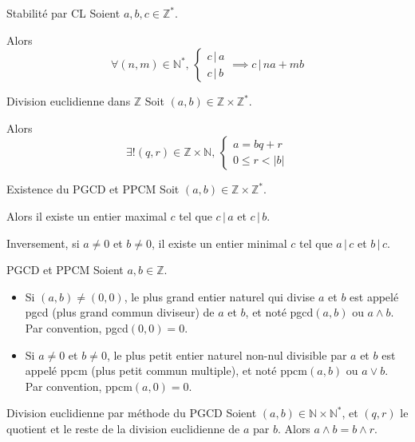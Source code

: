     \begin{prop}{Stabilité par CL}{}
        Soient $a,b,c \in \mathbb{Z}^*$.
    
        Alors \[ \forall (n,m) \in \mathbb{N}^*, \,\left\{ \begin{array}{l}
            c \, | \, a \\
            c \, | \, b
        \end{array} \right. \implies c \, | \, na + mb \]
    \end{prop}

    \begin{theo}{Division euclidienne dans $\mathbb{Z}$}{}
        Soit $(a,b) \in \mathbb{Z} \times \mathbb{Z}^*$. 
    
        Alors \[ \exists ! (q,r) \in \mathbb{Z} \times \mathbb{N}, \, \left\{ \begin{array}{l}
            a = bq + r\\
            0 \leq r < |b| 
            \end{array} \right. \]
    \end{theo}

    \begin{prop}{Existence du PGCD et PPCM}{}
        Soit $(a,b) \in \mathbb{Z} \times \mathbb{Z}^*$.
    
        Alors il existe un entier maximal $c$ tel que $c \, | \, a$ et $c \, | \, b$. 
    
        Inversement, si $a \neq 0$ et $b \neq 0$, il existe un entier minimal $c$ tel que $a \, |\, c$ et $b \,|\, c$.
    \end{prop}
    
    \begin{defi}{PGCD et PPCM}{}
        Soient $a,b \in \mathbb{Z}$.
        \begin{itemize}
            \item Si $(a,b) \neq (0,0)$, le plus grand entier naturel qui divise $a$ et $b$ est appelé pgcd (plus grand commun diviseur) de $a$ et $b$, et noté pgcd$(a,b)$ ou $a \wedge b$. Par convention, pgcd$(0,0) = 0$.
            \item Si $ a \neq 0$ et $b \neq 0$, le plus petit entier naturel non-nul divisible par $a$ et $b$ est appelé ppcm (plus petit commun multiple), et noté ppcm$(a,b)$ ou $a \vee b$. Par convention, ppcm$(a,0) = 0$.
        \end{itemize}
    \end{defi}

    \begin{lem}{Division euclidienne par méthode du PGCD}{}
        Soient $(a,b) \in \mathbb{N} \times \mathbb{N}^{*}$, et $(q,r)$ le quotient et le reste de la division euclidienne de $a$ par $b$. Alors $a \land b = b \land r$.
    \end{lem}
        
